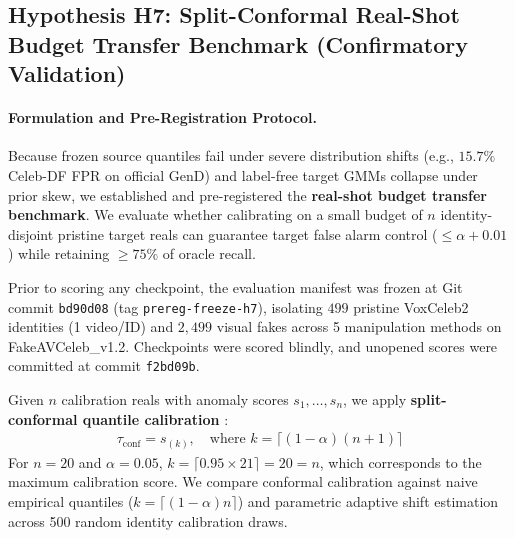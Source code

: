 \subsection{Hypothesis H7: Split-Conformal Real-Shot Budget Transfer Benchmark (Confirmatory Validation)}
\label{sec:real_shot}
\paragraph{Formulation and Pre-Registration Protocol.}
Because frozen source quantiles fail under severe distribution shifts (e.g., $15.7\%$ Celeb-DF FPR on official GenD) and label-free target GMMs collapse under prior skew, we established and pre-registered the \textbf{real-shot budget transfer benchmark}. We evaluate whether calibrating on a small budget of $n$ identity-disjoint pristine target reals can guarantee target false alarm control ($\le \alpha + 0.01$) while retaining $\ge 75\%$ of oracle recall.

Prior to scoring any checkpoint, the evaluation manifest was frozen at Git commit \texttt{bd90d08} (tag \texttt{prereg-freeze-h7}), isolating $499$ pristine VoxCeleb2 identities (1 video/ID) and $2{,}499$ visual fakes across 5 manipulation methods on FakeAVCeleb\_v1.2. Checkpoints were scored blindly, and unopened scores were committed at commit \texttt{f2bd09b}.

Given $n$ calibration reals with anomaly scores $s_1, \dots, s_n$, we apply \textbf{split-conformal quantile calibration} \citep{angelopoulos2021gentle}:
\begin{align}
\tau_{\text{conf}} = s_{(k)}, \quad \text{where } k = \lceil (1 - \alpha)(n + 1) \rceil
\end{align}
For $n=20$ and $\alpha=0.05$, $k = \lceil 0.95 \times 21 \rceil = 20 = n$, which corresponds to the maximum calibration score. We compare conformal calibration against naive empirical quantiles ($k = \lceil (1-\alpha)n \rceil$) and parametric adaptive shift estimation across 500 random identity calibration draws.


